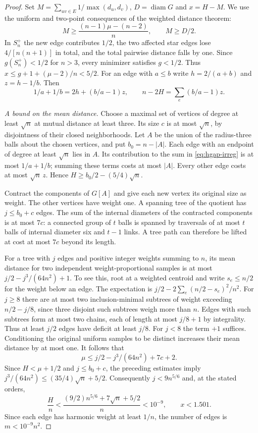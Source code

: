 \documentclass[11pt,a4paper]{article}
\begin{document}
\begin{proof}
Set $M=\sum_{uv\in E}1/\max(d_u,d_v)$, $D=\operatorname{diam}G$ and $x=H-M$. We use the uniform and two-point consequences of the weighted distance theorem:
\[
 M\ge\frac{(n-1)\mu-(n-2)}{n},\qquad M\ge D/2.
\]
In $S_n^+$ the new edge contributes $1/2$, the two affected star edges lose $4/[n(n+1)]$ in total, and the total pairwise distance falls by one. Since $g(S_n^+)<1/2$ for $n>3$, every minimizer satisfies $g<1/2$. Thus $x\le g+1+(\mu-2)/n<5/2$. For an edge with $a\le b$ write $h=2/(a+b)$ and $z=h-1/b$. Then
\begin{equation}\label{eq:hgap-irreg}
 1/a+1/b=2h+(b/a-1)z,\qquad n-2H=\sum_{e}(b/a-1)z.
\end{equation}

\emph{A bound on the mean distance.} Choose a maximal set of vertices of degree at least $\sqrt n$ at mutual distance at least three. Its size $c$ is at most $\sqrt n$, by disjointness of their closed neighborhoods. Let $A$ be the union of the radius-three balls about the chosen vertices, and put $b_0=n-|A|$. Each edge with an endpoint of degree at least $\sqrt n$ lies in $A$. Its contribution to the sum in \eqref{eq:hgap-irreg} is at most $1/a+1/b$; summing these terms costs at most $|A|$. Every other edge costs at most $\sqrt n\,z$. Hence $H\ge b_0/2-(5/4)\sqrt n$.

Contract the components of $G[A]$ and give each new vertex its original size as weight. The other vertices have weight one. A spanning tree of the quotient has $j\le b_0+c$ edges. The sum of the internal diameters of the contracted components is at most $7c$: a connected group of $t$ balls is spanned by traversals of at most $t$ balls of internal diameter six and $t-1$ links. A tree path can therefore be lifted at cost at most $7c$ beyond its length.

For a tree with $j$ edges and positive integer weights summing to $n$, its mean distance for two independent weight-proportional samples is at most $j/2-j^3/(64n^2)+1$. To see this, root at a weighted centroid and write $s_e\le n/2$ for the weight below an edge. The expectation is $j/2-2\sum_e(n/2-s_e)^2/n^2$. For $j\ge8$ there are at most two inclusion-minimal subtrees of weight exceeding $n/2-j/8$, since three disjoint such subtrees weigh more than $n$. Edges with such subtrees form at most two chains, each of length at most $j/8+1$ by integrality. Thus at least $j/2$ edges have deficit at least $j/8$. For $j<8$ the term $+1$ suffices. Conditioning the original uniform samples to be distinct increases their mean distance by at most one. It follows that
\[
 \mu\le j/2-j^3/(64n^2)+7c+2.
\]
Since $H<\mu+1/2$ and $j\le b_0+c$, the preceding estimates imply $j^3/(64n^2)\le(35/4)\sqrt n+5/2$. Consequently $j<9n^{5/6}$ and, at the stated orders,
\[
 \frac{H}{n}<\frac{(9/2)n^{5/6}+7\sqrt n+5/2}{n}<10^{-9},\qquad x<1.501.
\]
Since each edge has harmonic weight at least $1/n$, the number of edges is $m<10^{-9}n^2$.


\end{proof}
\end{document}
